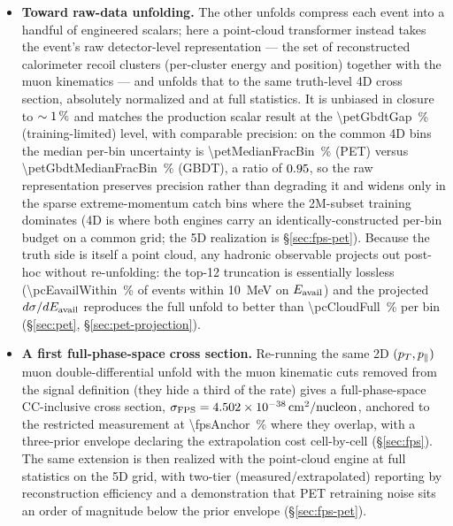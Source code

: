 \begin{itemize}[itemsep=2pt]
  \item \textbf{Toward raw-data unfolding.} 
  The other unfolds compress each event into a handful of engineered scalars; here a point-cloud transformer instead takes the event's raw detector-level representation --- the set of reconstructed calorimeter recoil clusters (per-cluster energy and position) together with the muon kinematics --- and unfolds that to the same truth-level 4D cross section, absolutely normalized and at full statistics. It is unbiased in closure to $\sim\SI{1}{\percent}$ and matches the production scalar result at the \SI{\petGbdtGap}{\percent} (training-limited) level, with comparable precision: on the \petCommonBins{} common 4D bins the median per-bin uncertainty is \SI{\petMedianFracBin}{\percent} (PET) versus \SI{\petGbdtMedianFracBin}{\percent} (GBDT), a ratio of $0.95$, so the raw representation preserves precision rather than degrading it and widens only in the sparse extreme-momentum catch bins where the 2M-subset training dominates (4D is where both engines carry an identically-constructed per-bin budget on a common grid; the 5D realization is \S\ref{sec:fps-pet}). Because the truth side is itself a point cloud, any hadronic observable projects out post-hoc without re-unfolding: the top-12 truncation is essentially lossless (\SI{\pcEavailWithin}{\percent} of events within \SI{10}{MeV} on $E_{\mathrm{avail}}$) and the projected $d\sigma/dE_{\mathrm{avail}}$ reproduces the full unfold to better than \SI{\pcCloudFull}{\percent} per bin (\S\ref{sec:pet}, \S\ref{sec:pet-projection}).
   

  \item \textbf{A first full-phase-space cross section.}  
  Re-running the same 2D $(p_{T},p_{\parallel})$ muon double-differential unfold with the muon kinematic cuts removed from the signal definition (they hide a third of the rate) gives a full-phase-space CC-inclusive cross section, $\sigma_{\mathrm{FPS}}=\SI{4.502e-38}{cm^2/nucleon}$, anchored to the restricted measurement at \SI{\fpsAnchor}{\percent} where they overlap, with a three-prior envelope declaring the extrapolation cost cell-by-cell (\S\ref{sec:fps}). The same extension is then realized with the point-cloud engine at full statistics on the 5D grid, with two-tier (measured/extrapolated) reporting by reconstruction efficiency and a demonstration that PET retraining noise sits an order of magnitude below the prior envelope (\S\ref{sec:fps-pet}).
 
  
\end{itemize}

